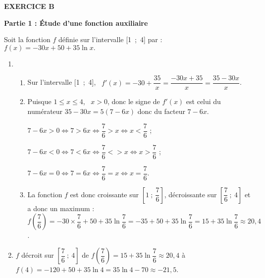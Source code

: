\textbf{EXERCICE B}

\medskip

%
%
%
%
%

\begin{center}\textbf{Partie 1 : Étude d'une fonction auxiliaire}\end{center}

\begin{center}
Soit la fonction $f$ définie sur l'intervalle [1~;~4] par : 
$f(x) = - 30x + 50 + 35\ln x.$
\end{center}

\begin{enumerate}
\item %
	\begin{enumerate}
		\item %
Sur l'intervalle [1~;~4], \, $f'(x) = - 30 + \dfrac{35}{x} = \dfrac{- 30x + 35}{x} = \dfrac{35- 30x}{x}$.		

		\item %
Puisque $1 \leqslant x \leqslant 4$, \, $ x > 0$, donc le signe de $f'(x)$ est celui du numérateur $35 - 30x = 5(7 - 6x)$ donc du facteur $7 - 6x$.

$7 - 6x > 0 \iff 7 > 6x \iff \dfrac{7}{6} > x \iff x < \dfrac{7}{6}$ ;

$7 - 6x < 0 \iff 7 < 6x \iff \dfrac{7}{6} <> x \iff x > \dfrac{7}{6}$ ;

$7 - 6x = 0 \iff 7 = 6x \iff \dfrac{7}{6} = x \iff x = \dfrac{7}{6}$.
		\item %
La fonction $f$ est donc croissante sur $\left[1~;~\dfrac{7}{6}\right]$, décroissante sur $\left[\dfrac{7}{6}~;~4\right]$ et a donc un maximum : $f\left(\dfrac{7}{6}\right) = - 30 \times \dfrac{7}{6} + 50 + 35 \ln \dfrac{7}{6} = - 35 + 50 + 35 \ln \dfrac{7}{6} = 15 + 35 \ln \dfrac{7}{6} \approx 20,4$.
	\end{enumerate}
\item %
$f$ décroit sur $\left[\dfrac{7}{6}~;~4\right]$ de $f\left(\dfrac{7}{6}\right) =15 + 35 \ln \dfrac{7}{6} \approx 20,4$ à $f(4) = - 120 + 50 + 35 \ln 4 = 35\ln 4 - 70 \approx - 21,5$.


\end{enumerate}
